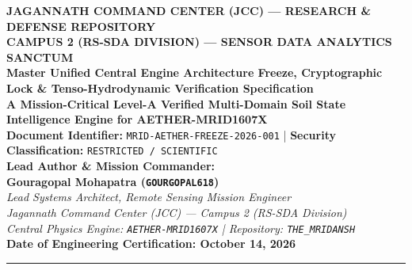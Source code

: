 \documentclass[11pt,a4paper]{article}
\theoremstyle{definition}
\theoremstyle{remark}
\begin{document}
\begin{center}
    {\Large \textbf{JAGANNATH COMMAND CENTER (JCC) --- RESEARCH \& DEFENSE REPOSITORY}}\\[0.2cm]
    {\large \textbf{CAMPUS 2 (RS-SDA DIVISION) --- SENSOR DATA ANALYTICS SANCTUM}}\\[0.4cm]
    {\LARGE \textbf{Master Unified Central Engine Architecture Freeze, Cryptographic Lock \& Tenso-Hydrodynamic Verification Specification}}\\[0.3cm]
    {\large \textbf{A Mission-Critical Level-A Verified Multi-Domain Soil State Intelligence Engine for AETHER-MRID1607X}}\\[0.4cm]
    \textbf{Document Identifier:} \texttt{MRID-AETHER-FREEZE-2026-001} \quad | \quad \textbf{Security Classification:} \texttt{RESTRICTED / SCIENTIFIC} \\[0.3cm]

    \textbf{Lead Author \& Mission Commander:}\\
    \textbf{Gouragopal Mohapatra (\texttt{GOURGOPAL618})}\\
    \textit{Lead Systems Architect, Remote Sensing Mission Engineer}\\
    \textit{Jagannath Command Center (JCC) --- Campus 2 (RS-SDA Division)}\\
    \textit{Central Physics Engine: \texttt{AETHER-MRID1607X} \quad | \quad Repository: \texttt{THE\_MRIDANSH}}\\[0.2cm]
    \textbf{Date of Engineering Certification: October 14, 2026}
\end{center}

\vspace{0.4cm}
\hrule
\vspace{0.4cm}
\end{document}
